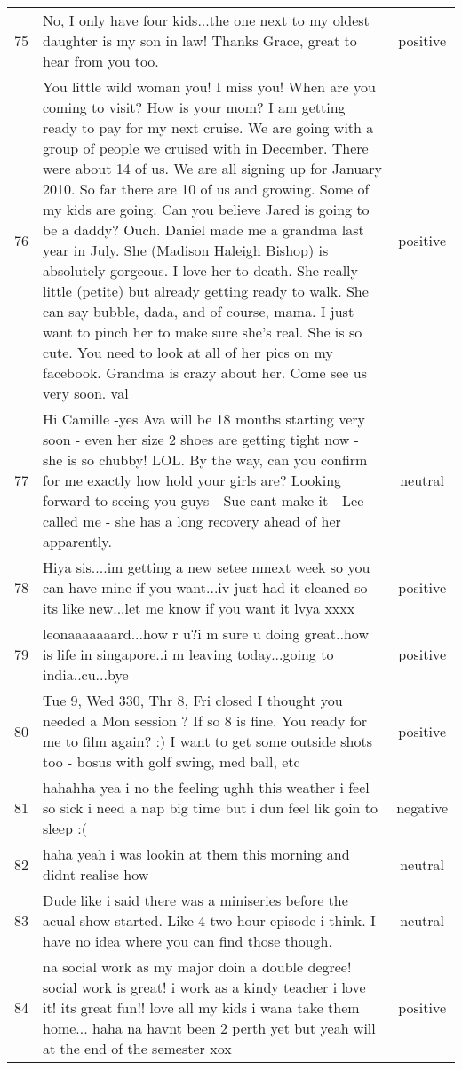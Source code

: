 \begin{center}
\begin{footnotesize}
\begin{longtable}{cp{3.8in}c}
75 & No, I only have four kids...the one next to my oldest daughter is my son in law!  Thanks Grace, great to hear from you too. & positive\\
76 & You little wild woman you!  I miss you!  When are you coming to visit?  How is your mom?  I am getting ready to pay for my next cruise.  We are going with a group of people we cruised with in December.  There were about 14 of us.  We are all signing up for January 2010.  So far there are 10 of us and growing.  Some of my kids are going.  Can you believe Jared is going to be a daddy?  Ouch.  Daniel made me a grandma last year in July.  She (Madison Haleigh Bishop) is absolutely gorgeous.  I love her to death.  She really little (petite) but already getting ready to walk.  She can say bubble, dada, and of course, mama.  I just want to pinch her to make sure she's real.  She is so cute.  You need to look at all of her pics on my facebook.  Grandma is crazy about her.  Come see us very soon.  val & positive\\
77 & Hi Camille -yes Ava will be 18 months starting very soon - even her size 2 shoes are getting tight now - she is so chubby!  LOL.  By the way, can you confirm for me exactly how hold your girls are?  Looking forward to seeing you guys - Sue cant make it - Lee called me - she has a long recovery ahead of her apparently. & neutral\\
78 & Hiya sis....im getting a new setee nmext week so you can have mine if you want...iv just had it cleaned so its like new...let me know if you want it lvya xxxx & positive\\
79 & leonaaaaaaard...how r u?i m sure u doing great..how is life in singapore..i m leaving today...going to india..cu...bye & positive\\
80 & Tue 9, Wed 330, Thr 8, Fri closed  I thought you needed a Mon session ? If so 8 is fine. You ready for me to film again? :) I want to get some outside shots too - bosus with golf swing, med ball, etc & positive\\
81 & hahahha yea i no the feeling ughh this weather i feel so sick i need a nap big time but i dun feel lik goin to sleep :( & negative\\
82 & haha yeah i was lookin at them this morning and didnt realise how & neutral\\
83 & Dude like i said there was a miniseries before the acual show started. Like 4 two hour episode i think. I have no idea where you can find those though. & neutral\\
84 & na social work as my major doin a double degree! social work is great! i work as a kindy teacher i love it! its great fun!! love all my kids i wana take them home... haha na havnt been 2 perth yet but yeah will at the end of the semester xox & positive\\

\end{longtable}
\end{footnotesize}
\end{center}
